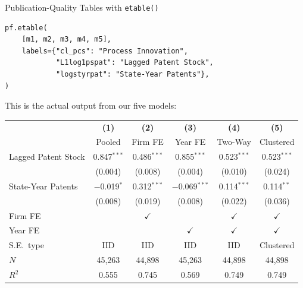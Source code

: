 \documentclass[9pt,aspectratio=169]{beamer}
\begin{document}
\begin{frame}[fragile]{Publication-Quality Tables with \texttt{etable()}}

\begin{lstlisting}[basicstyle=\ttfamily\scriptsize]
pf.etable(
    [m1, m2, m3, m4, m5],
    labels={"cl_pcs": "Process Innovation",
            "L1log1pspat": "Lagged Patent Stock",
            "logstyrpat": "State-Year Patents"},
)
\end{lstlisting}

\medskip

This is the actual output from our five models:

\smallskip

{\scriptsize
\begin{tabular}{@{}lccccc@{}}
\toprule
& \textbf{(1)} & \textbf{(2)} & \textbf{(3)} & \textbf{(4)} & \textbf{(5)} \\
& Pooled & Firm FE & Year FE & Two-Way & Clustered \\
\midrule
Lagged Patent Stock
  & 0.847$^{***}$ & 0.486$^{***}$ & 0.855$^{***}$ & 0.523$^{***}$ & 0.523$^{***}$ \\
  & \tiny(0.004) & \tiny(0.008) & \tiny(0.004) & \tiny(0.010) & \tiny\alert{(0.024)} \\[3pt]
State-Year Patents
  & $-$0.019$^{*}$\phantom{**} & 0.312$^{***}$ & $-$0.069$^{***}$ & 0.114$^{***}$ & 0.114$^{**}$\phantom{*} \\
  & \tiny(0.008) & \tiny(0.019) & \tiny(0.008) & \tiny(0.022) & \tiny\alert{(0.036)} \\
\midrule
Firm FE  & & $\checkmark$ & & $\checkmark$ & $\checkmark$ \\
Year FE  & & & $\checkmark$ & $\checkmark$ & $\checkmark$ \\
S.E.\ type & IID & IID & IID & IID & Clustered \\
\midrule
$N$      & 45{,}263 & 44{,}898 & 45{,}263 & 44{,}898 & 44{,}898 \\
$R^2$    & 0.555 & 0.745 & 0.569 & 0.749 & 0.749 \\
\bottomrule
\end{tabular}}

\end{frame}
\end{document}
